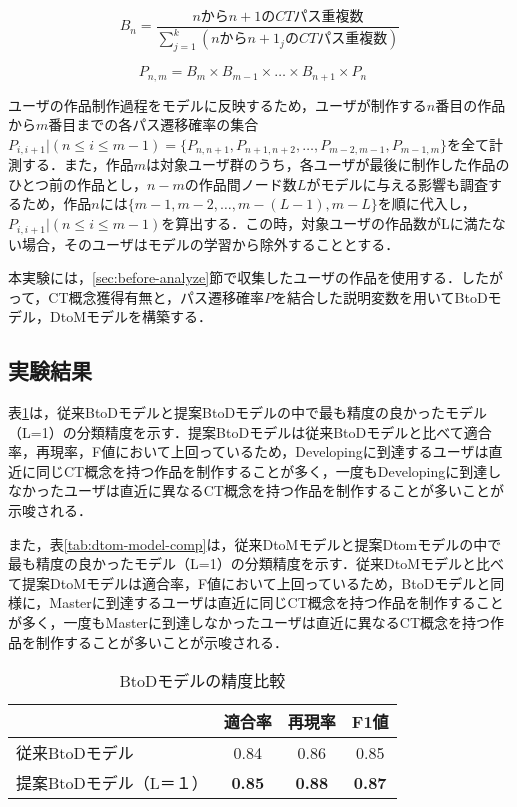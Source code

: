 \documentclass[twocolumn]{jarticle} %
\begin{document}
\vspace{-6mm}

\begin{equation}
  B_n = \frac{nからn+1のCT
  パス重複数}{\sum_{j=1}^{k} (nからn+1_jのCTパス重複数)} \label{formula: single-ct-path}
\end{equation}

\vspace{-5mm}

\begin{equation}\label{formula:ct-path}
  P_{n,m} = B_m \times B_{m-1} \times \ldots \times B_{n+1} \times P_n \quad 
\end{equation}

ユーザの作品制作過程をモデルに反映するため，ユーザが制作する$n$番目の作品から$m$番目までの各パス遷移確率の集合$P_{i,i+1}|(n \leq i \leq m - 1)=\{P_{n,n+1}, P_{n+1,n+2}, \dots, P_{m-2, m-1}, P_{m-1, m}\}$を全て計測する．また，作品$m$は対象ユーザ群のうち，各ユーザが最後に制作した作品のひとつ前の作品とし，$n-m$の作品間ノード数$L$がモデルに与える影響も調査するため，作品$n$には$\{m-1, m-2,\dots, m-(L-1), m-L\}$を順に代入し，$P_{i,i+1}|(n \leq i \leq m - 1)$を算出する．この時，対象ユーザの作品数がLに満たない場合，そのユーザはモデルの学習から除外することとする．

本実験には，\ref{sec:before-analyze}節で収集したユーザの作品を使用する．したがって，CT概念獲得有無と，パス遷移確率$P$を結合した説明変数を用いてBtoDモデル，DtoMモデルを構築する．

\subsection{実験結果}
表\ref{tab:btod-model-comp}は，従来BtoDモデルと提案BtoDモデルの中で最も精度の良かったモデル（L=1）の分類精度を示す．提案BtoDモデルは従来BtoDモデルと比べて適合率，再現率，F値において上回っているため，Developingに到達するユーザは直近に同じCT概念を持つ作品を制作することが多く，一度もDevelopingに到達しなかったユーザは直近に異なるCT概念を持つ作品を制作することが多いことが示唆される．

また，表\ref{tab:dtom-model-comp}は，従来DtoMモデルと提案Dtomモデルの中で最も精度の良かったモデル（L=1）の分類精度を示す．従来DtoMモデルと比べて提案DtoMモデルは適合率，F値において上回っているため，BtoDモデルと同様に，Masterに到達するユーザは直近に同じCT概念を持つ作品を制作することが多く，一度もMasterに到達しなかったユーザは直近に異なるCT概念を持つ作品を制作することが多いことが示唆される．

\begin{table}
  \caption{BtoDモデルの精度比較}
  \label{tab:btod-model-comp}
  \vspace{2mm}
  \centering
  \begin{tabular}{l|c|c|c}
    \hline
     & 適合率 & 再現率 & F1値\\
    \hline
    \hline
    従来BtoDモデル & 0.84 & 0.86 & 0.85\\
    \hline
    提案BtoDモデル（L＝１） & \textbf{0.85} & \textbf{0.88} & \textbf{0.87}\\
    \hline
  \end{tabular}
\end{table}
\end{document}
